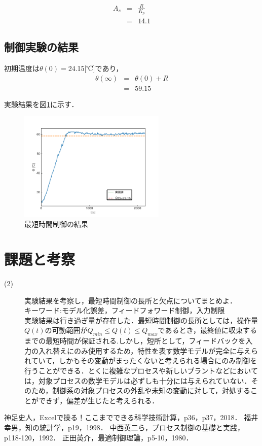 \documentclass[12pt]{jsarticle}
\begin{document}
\begin{eqnarray}
  \label{A_s}
  A_s &=& \frac{R}{K_p} \\
      &=& 14.1
\end{eqnarray}
\subsection{制御実験の結果}
初期温度は$\theta(0)=$24.15[℃]であり，
\begin{eqnarray}
  \label{}
  \theta(\infty) &=& \theta(0) + R\\
  &=& 59.15
\end{eqnarray}

実験結果を図\ref{Control_Exp}に示す．
\begin{figure}[H]
  \begin{center}
    \includegraphics[clip,width=7.0cm]{../graph/Control_Exp.png}
    \caption{最短時間制御の結果}
    \label{Control_Exp}
  \end{center}
\end{figure}

\newpage
\section{課題と考察}
\begin{description}
\item[(2)]実験結果を考察し，最短時間制御の長所と欠点についてまとめよ．\\
キーワード:モデル化誤差，フィードフォワード制御，入力制限\\
  実験結果は行き過ぎ量が存在した．最短時間制御の長所としては，操作量$Q(t)$の可動範囲が$Q_{min} \leq Q(t) \leq Q_{max}$であるとき，最終値に収束するまでの最短時間が保証される\cite{process_control}.しかし，短所として，フィードバックを入力の入れ替えにのみ使用するため，特性を表す数学モデルが完全に与えられていて，しかもその変動がまったくないと考えられる場合にのみ制御を行うことができる．とくに複雑なプロセスや新しいプラントなどにおいては，対象プロセスの数学モデルは必ずしも十分には与えられていない\cite{optimal_controll_theory}．そのため，制御系の対象プロセスの外乱や未知の変動に対して，対処することができず，偏差が生じたと考えられる．
\end{description}

\begin{thebibliography}{9}
   神足史人，Excelで操る！ここまでできる科学技術計算，p36，p37，2018．
   福井幸男，知の統計学，p19，1998．
   中西英二ら，プロセス制御の基礎と実践，p118-120，1992．
   正田英介，最適制御理論，p5-10，1980．
\end{thebibliography}
\end{document}
